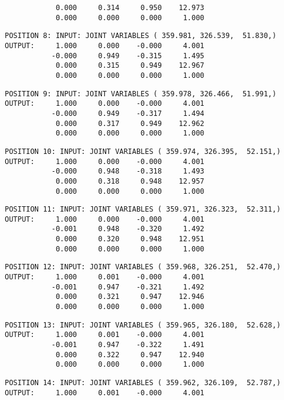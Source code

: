 \begin{verbatim}
            0.000     0.314     0.950    12.973
            0.000     0.000     0.000     1.000
\end{verbatim} \pagebreak[1]\begin{verbatim}
POSITION 8: INPUT: JOINT VARIABLES ( 359.981, 326.539,  51.830,)
OUTPUT:     1.000     0.000    -0.000     4.001
           -0.000     0.949    -0.315     1.495
            0.000     0.315     0.949    12.967
            0.000     0.000     0.000     1.000
\end{verbatim} \pagebreak[1]\begin{verbatim}
POSITION 9: INPUT: JOINT VARIABLES ( 359.978, 326.466,  51.991,)
OUTPUT:     1.000     0.000    -0.000     4.001
           -0.000     0.949    -0.317     1.494
            0.000     0.317     0.949    12.962
            0.000     0.000     0.000     1.000
\end{verbatim} \pagebreak[1]\begin{verbatim}
POSITION 10: INPUT: JOINT VARIABLES ( 359.974, 326.395,  52.151,)
OUTPUT:     1.000     0.000    -0.000     4.001
           -0.000     0.948    -0.318     1.493
            0.000     0.318     0.948    12.957
            0.000     0.000     0.000     1.000
\end{verbatim} \pagebreak[1]\begin{verbatim}
POSITION 11: INPUT: JOINT VARIABLES ( 359.971, 326.323,  52.311,)
OUTPUT:     1.000     0.000    -0.000     4.001
           -0.001     0.948    -0.320     1.492
            0.000     0.320     0.948    12.951
            0.000     0.000     0.000     1.000
\end{verbatim} \pagebreak[1]\begin{verbatim}
POSITION 12: INPUT: JOINT VARIABLES ( 359.968, 326.251,  52.470,)
OUTPUT:     1.000     0.001    -0.000     4.001
           -0.001     0.947    -0.321     1.492
            0.000     0.321     0.947    12.946
            0.000     0.000     0.000     1.000
\end{verbatim} \pagebreak[1]\begin{verbatim}
POSITION 13: INPUT: JOINT VARIABLES ( 359.965, 326.180,  52.628,)
OUTPUT:     1.000     0.001    -0.000     4.001
           -0.001     0.947    -0.322     1.491
            0.000     0.322     0.947    12.940
            0.000     0.000     0.000     1.000
\end{verbatim} \pagebreak[1]\begin{verbatim}
POSITION 14: INPUT: JOINT VARIABLES ( 359.962, 326.109,  52.787,)
OUTPUT:     1.000     0.001    -0.000     4.001

\end{verbatim}
